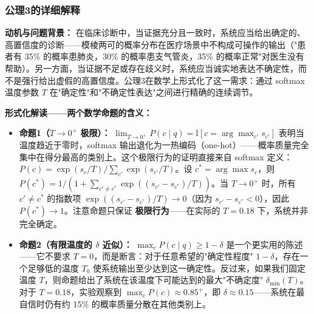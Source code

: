 \documentclass[11pt,a4paper]{ctexart}
\theoremstyle{remark}
\begin{document}
\subsubsection{公理3的详细解释}

\textbf{动机与问题背景：} 在临床诊断中，当证据充分且一致时，系统应当给出确定的、高置信度的诊断——模棱两可的概率分布在医疗场景中不构成可操作的输出（"患者有 35\% 的概率患肺炎，30\% 的概率患支气管炎，35\% 的概率正常"对医生没有帮助）。另一方面，当证据不足或存在歧义时，系统应当诚实地表达不确定性，而不是强行给出虚假的高置信度。公理3在数学上形式化了这一需求：通过 softmax 温度参数 $T$ 在"确定性"和"不确定性表达"之间进行精确的连续调节。

\textbf{形式化解读——两个数学命题的含义：}
\begin{itemize}[nosep]
\item \textbf{命题1（$T \to 0^+$ 极限）：} $\lim_{T \to 0^+} P(c \mid q) = \mathbb{I}[c = \arg\max_{c'} s_{c'}]$ 表明当温度趋近于零时，softmax 输出退化为一热编码（one-hot）——概率质量完全集中在得分最高的类别上。这个极限行为的证明直接来自 softmax 定义：$P(c) = \exp(s_c/T) / \sum_{c'} \exp(s_{c'}/T)$。设 $c^* = \arg\max s_c$，则 $P(c^*) = 1 / (1 + \sum_{c' \neq c^*} \exp((s_{c'} - s_{c^*})/T))$。当 $T \to 0^+$ 时，所有 $c' \neq c^*$ 的指数项 $\exp((s_{c'} - s_{c^*})/T) \to 0$（因为 $s_{c'} - s_{c^*} < 0$），因此 $P(c^*) \to 1$。注意命题只保证 \textbf{极限行为}——在实际的 $T=0.18$ 下，系统并非完全确定。
\item \textbf{命题2（有限温度的 $\delta$ 近似）：} $\max_c P(c \mid q) \geq 1 - \delta$ 是一个更实用的陈述——它不要求 $T=0$，而是断言：对于任意希望的"确定性程度" $1-\delta$，存在一个足够低的温度 $T_0$ 使系统输出至少达到这一确定性。反过来，如果我们固定温度 $T$，则命题给出了系统在该温度下可能达到的最大"不确定度" $\delta_{\min}(T)$。对于 $T=0.18$，实验观察到 $\max_c P(c) \approx 0.85^+$，即 $\delta \approx 0.15$——系统在最自信时仍有约 15\% 的概率质量分散在其他类别上。
\end{itemize}
\end{document}
